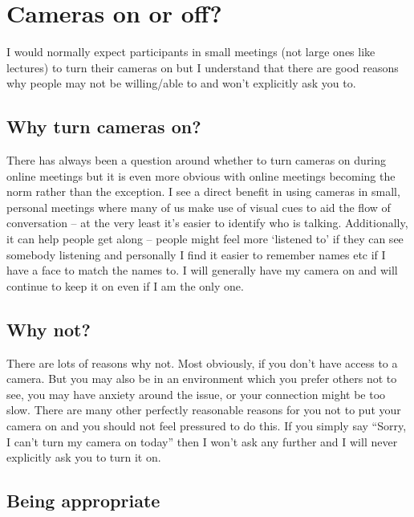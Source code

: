 \documentclass[
]{book}
\begin{document}
\hypertarget{cameras}{%
\section{Cameras on or off?}\label{cameras}}

I would normally expect participants in small meetings (not large ones like lectures) to turn their cameras on but I understand that there are good reasons why people may not be willing/able to and won't explicitly ask you to.

\hypertarget{why-turn-cameras-on}{%
\subsection{Why turn cameras on?}\label{why-turn-cameras-on}}

There has always been a question around whether to turn cameras on during online meetings but it is even more obvious with online meetings becoming the norm rather than the exception. I see a direct benefit in using cameras in small, personal meetings where many of us make use of visual cues to aid the flow of conversation -- at the very least it's easier to identify who is talking. Additionally, it can help people get along -- people might feel more `listened to' if they can see somebody listening and personally I find it easier to remember names etc if I have a face to match the names to. I will generally have my camera on and will continue to keep it on even if I am the only one.

\hypertarget{why-not}{%
\subsection{Why not?}\label{why-not}}

There are lots of reasons why not. Most obviously, if you don't have access to a camera. But you may also be in an environment which you prefer others not to see, you may have anxiety around the issue, or your connection might be too slow. There are many other perfectly reasonable reasons for you not to put your camera on and you should not feel pressured to do this. If you simply say ``Sorry, I can't turn my camera on today'' then I won't ask any further and I will never explicitly ask you to turn it on.

\hypertarget{being-appropriate}{%
\subsection{Being appropriate}\label{being-appropriate}}
\end{document}
